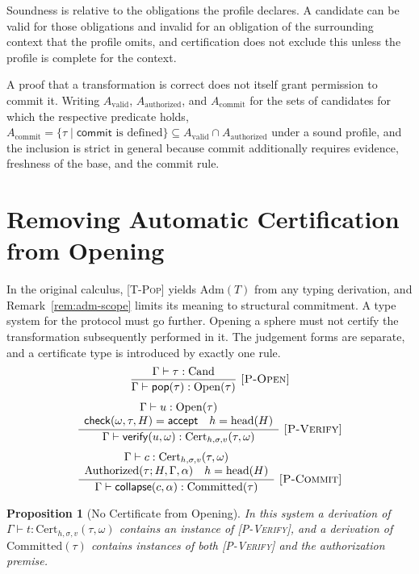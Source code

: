 \documentclass[12pt,oneside,openany]{book}
\theoremstyle{spherepop}
\newtheorem{proposition}[definition]{Proposition}
\theoremstyle{remarkstyle}
\newcommand{\Adm}[1]{\mathrm{Adm}(#1)}
\begin{document}
Soundness is relative to the obligations the profile declares. A candidate can be valid for those obligations and invalid for an obligation of the surrounding context that the profile omits, and certification does not exclude this unless the profile is complete for the context.

A proof that a transformation is correct does not itself grant permission to commit it. Writing $A_{\mathrm{valid}}$, $A_{\mathrm{authorized}}$, and $A_{\mathrm{commit}}$ for the sets of candidates for which the respective predicate holds, $A_{\mathrm{commit}}=\{\tau\mid\mathsf{commit}\text{ is defined}\}\subseteq A_{\mathrm{valid}}\cap A_{\mathrm{authorized}}$ under a sound profile, and the inclusion is strict in general because commit additionally requires evidence, freshness of the base, and the commit rule.

\section{Removing Automatic Certification from Opening}

In the original calculus, \textsc{[T-Pop]} yields $\Adm{T}$ from any typing derivation, and Remark~\ref{rem:adm-scope} limits its meaning to structural commitment. A type system for the protocol must go further. Opening a sphere must not certify the transformation subsequently performed in it. The judgement forms are separate, and a certificate type is introduced by exactly one rule.
\[
\frac{\Gamma\vdash\tau:\mathrm{Cand}}{\Gamma\vdash\mathsf{pop}(\tau):\mathrm{Open}(\tau)}\ \textsc{[P-Open]}
\]
\[
\frac{\begin{array}{c}\Gamma\vdash u:\mathrm{Open}(\tau)\\\mathsf{check}(\omega,\tau,H)=\mathsf{accept}\quad h=\mathrm{head}(H)\end{array}}{\Gamma\vdash\mathsf{verify}(u,\omega):\mathrm{Cert}_{h,\sigma,v}(\tau,\omega)}\ \textsc{[P-Verify]}
\]
\[
\frac{\begin{array}{c}\Gamma\vdash c:\mathrm{Cert}_{h,\sigma,v}(\tau,\omega)\\\mathrm{Authorized}(\tau;H,\Gamma,\alpha)\quad h=\mathrm{head}(H)\end{array}}{\Gamma\vdash\mathsf{collapse}(c,\alpha):\mathrm{Committed}(\tau)}\ \textsc{[P-Commit]}
\]

\begin{proposition}[No Certificate from Opening]
In this system a derivation of $\Gamma\vdash t:\mathrm{Cert}_{h,\sigma,v}(\tau,\omega)$ contains an instance of \textsc{[P-Verify]}, and a derivation of $\mathrm{Committed}(\tau)$ contains instances of both \textsc{[P-Verify]} and the authorization premise.
\end{proposition}
\end{document}
